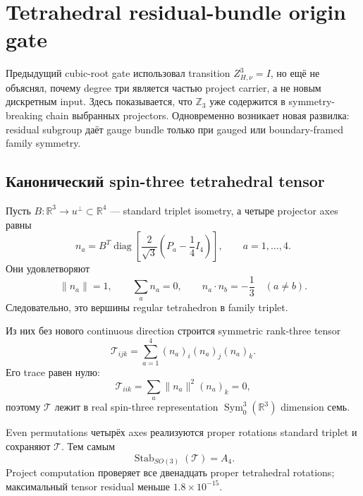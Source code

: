 \chapter{Tetrahedral residual-bundle origin gate}

Предыдущий cubic-root gate использовал transition
\(Z_{H,\nu}^3=I\), но ещё не объяснял, почему degree три является частью
project carrier, а не новым дискретным input. Здесь показывается, что
\(\mathbb Z_3\) уже содержится в symmetry-breaking chain выбранных
projectors. Одновременно возникает новая развилка: residual subgroup даёт
gauge bundle только при gauged или boundary-framed family symmetry.

\section{Канонический spin-three tetrahedral tensor}

Пусть \(B:\mathbb R^3\to u^\perp\subset\mathbb R^4\) --- standard triplet
isometry, а четыре projector axes равны
\begin{equation}
 n_a=B^T\operatorname{diag}\!\left[
 \frac{2}{\sqrt3}\left(P_a-\frac14I_4\right)
 \right],
 \qquad a=1,\ldots,4.
 \label{eq:project-tetrahedral-axes}
\end{equation}
Они удовлетворяют
\begin{equation}
 \|n_a\|=1,
 \qquad
 \sum_an_a=0,
 \qquad
 n_a\cdot n_b=-\frac13\quad(a\ne b).
\end{equation}
Следовательно, это вершины regular tetrahedron в family triplet.

Из них без нового continuous direction строится symmetric rank-three
tensor
\begin{equation}
 \mathcal T_{ijk}=\sum_{a=1}^4(n_a)_i(n_a)_j(n_a)_k.
 \label{eq:project-spin-three-tensor}
\end{equation}
Его trace равен нулю:
\begin{equation}
 \mathcal T_{iik}=\sum_a\|n_a\|^2(n_a)_k=0,
\end{equation}
поэтому \(\mathcal T\) лежит в real spin-three representation
\(\operatorname{Sym}^3_0(\mathbb R^3)\) dimension семь.

Even permutations четырёх axes реализуются proper rotations standard
triplet и сохраняют \(\mathcal T\). Тем самым
\begin{equation}
 \operatorname{Stab}_{SO(3)}(\mathcal T)=A_4.
 \label{eq:so3-to-a4-breaking}
\end{equation}
Project computation проверяет все двенадцать proper tetrahedral rotations;
максимальный tensor residual меньше \(1.8\times10^{-15}\).

